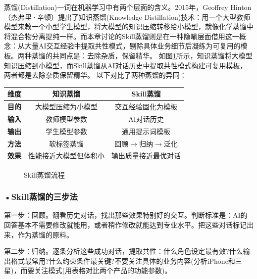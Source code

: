 \vfill
\begin{knowledgebox}
蒸馏(Distillation)一词在机器学习中有两个层面的含义。2015年，Geoffrey Hinton（杰弗里·辛顿）提出了知识蒸馏(Knowledge Distillation)技术：用一个大型教师模型来教一个小型学生模型，将大模型的知识压缩转移给小模型，就像化学蒸馏中将混合物分离提纯一样。而本章讨论的Skill蒸馏则是在一种隐喻层面借用这一概念：从大量AI交互经验中提取共性模式，剔除具体业务细节后凝练为可复用的模板。两种蒸馏的共同点是：去除杂质，保留精华。 如图\ref{fig:ch3_3_14}所示，知识蒸馏将大模型知识压缩到小模型，而Skill蒸馏从AI对话历史中提取共性模式构建可复用模板，两者都是去除杂质保留精华。
以下对比了两种蒸馏的异同：

\begin{formalTable}[H]
\caption{知识蒸馏与Skill蒸馏对比}
\label{tab:ch3_04_distillation}
\begin{tabular}{c c c}
\toprule
\bfseries 维度 & \bfseries 知识蒸馏 & \bfseries Skill蒸馏 \\ \midrule
\bfseries 目的 & 大模型压缩为小模型 & 交互经验固化为模板 \\
\bfseries 输入 & 教师模型参数 & AI对话历史 \\
\bfseries 输出 & 学生模型参数 & 通用提示词模板 \\
\bfseries 方法 & 软标签蒸馏 & 回顾$\rightarrow$归纳$\rightarrow$泛化 \\
\bfseries 效果 & 性能接近大模型但体积小 & 输出质量接近最优对话 \\ \bottomrule
\end{tabular}
\end{formalTable}
\end{knowledgebox}
\vspace{1em}

\begin{figure}[H]
\centering
{}
\caption{Skill蒸馏流程}
\label{fig:ch3_3_14}
\end{figure}

\subsubsection*{\textbf{•Skill蒸馏的三步法}}


第一步：回顾。翻看历史对话，找出那些效果特别好的交互。判断标准是：AI的回答基本不需要修改就能用，或者稍作修改就能达到专业水平。把这些对话标记出来，作为蒸馏的原料。

第二步：归纳。逐条分析这些成功对话，提取共性：什么角色设定最有效?什么输出格式最常用?什么约束条件最关键?不要关注具体的业务内容(分析iPhone和三星)，而要关注模式(用表格对比两个产品的功能参数)。

